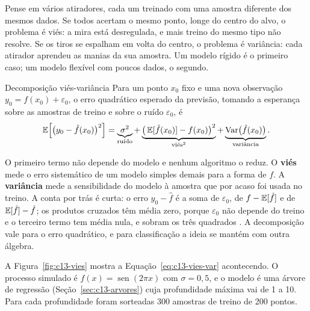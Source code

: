 Pense em vários atiradores, cada um treinado com uma amostra diferente dos mesmos dados. Se todos acertam o mesmo ponto, longe do centro do alvo, o problema é viés: a mira está desregulada, e mais treino do mesmo tipo não resolve. Se os tiros se espalham em volta do centro, o problema é variância: cada atirador aprendeu as manias da sua amostra. Um modelo rígido é o primeiro caso; um modelo flexível com poucos dados, o segundo.

\begin{resultado}{Decomposição viés-variância}
Para um ponto $x_0$ fixo e uma nova observação $y_0 = f(x_0) + \varepsilon_0$, o erro quadrático esperado da previsão, tomando a esperança sobre as amostras de treino e sobre o ruído $\varepsilon_0$, é
\begin{equation}
  \operatorname{\mathbb{E}}\!\left[\big(y_0 - \hat f(x_0)\big)^2\right]
  = \underbrace{\sigma^2}_{\text{ruído}}
  + \underbrace{\big(\operatorname{\mathbb{E}}[\hat f(x_0)] - f(x_0)\big)^2}_{\text{viés}^2}
  + \underbrace{\operatorname{Var}\!\big(\hat f(x_0)\big)}_{\text{variância}} .
  \label{eq:c13-vies-var}
\end{equation}
\end{resultado}

O primeiro termo não depende do modelo e nenhum algoritmo o reduz. O \textbf{viés} mede o erro sistemático de um modelo simples demais para a forma de $f$. A \textbf{variância} mede a sensibilidade do modelo à amostra que por acaso foi usada no treino. A conta por trás é curta: o erro $y_0 - \hat f$ é a soma de $\varepsilon_0$, de $f - \operatorname{\mathbb{E}}[\hat f]$ e de $\operatorname{\mathbb{E}}[\hat f] - \hat f$; os produtos cruzados têm média zero, porque $\varepsilon_0$ não depende do treino e o terceiro termo tem média nula, e sobram os três quadrados \citep[seção 7.3]{hastie2009}. A decomposição vale para o erro quadrático, e para classificação a ideia se mantém com outra álgebra.

A Figura~\ref{fig:c13-vies} mostra a Equação~\eqref{eq:c13-vies-var} acontecendo. O processo simulado é $f(x) = \operatorname{sen}(2\pi x)$ com $\sigma = 0,5$, e o modelo é uma árvore de regressão (Seção~\ref{sec:c13-arvores}) cuja profundidade máxima vai de 1 a 10. Para cada profundidade foram sorteadas 300 amostras de treino de 200 pontos.


